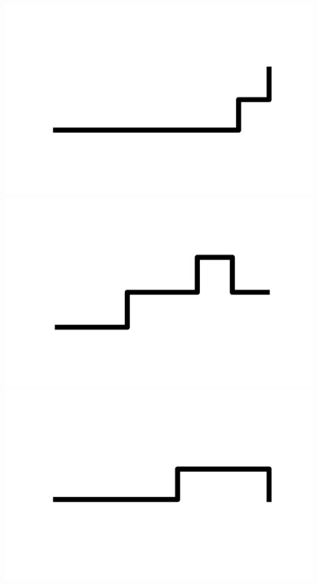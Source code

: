 \documentclass[]{report}
\begin{document}
\includegraphics[scale=.1]{pictures/21/state_cluster_shapes_388.pdf} 
\includegraphics[scale=.1]{pictures/21/state_cluster_shapes_389.pdf} 
\includegraphics[scale=.1]{pictures/21/state_cluster_shapes_390.pdf} 
\end{document}
